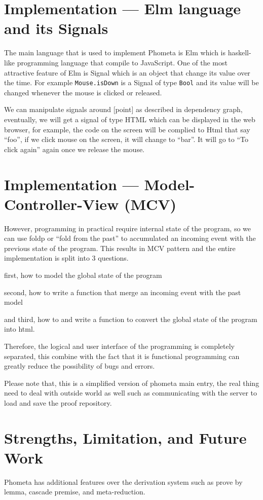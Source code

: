 \documentclass[11pt, a4paper]{article}
\begin{document}
\section{Implementation --- Elm language and its Signals}

The main language that is used to implement Phometa is Elm which is haskell-like
programming language that compile to JavaScript. One of the most attractive
feature of Elm is Signal which is an object that change its value over the time.
For example \texttt{Mouse.isDown} is a Signal of type \texttt{Bool} and its
value will be changed whenever the mouse is clicked or released.

We can manipulate signals around [point] as described in dependency graph,
eventually, we will get a signal of type HTML which can be displayed in the web
browser, for example, the code on the screen will be complied to Html that say
``foo'', if we click mouse on the screen, it will change to ``bar''. It
will go to ``To click again'' again once we release the mouse.

\section{Implementation --- Model-Controller-View (MCV)}

However, programming in practical require internal state of the program, so we
can use foldp or ``fold from the past'' to accumulated an incoming event
with the previous state of the program. This results in MCV pattern
and the entire implementation is split into 3 questions.

first, how to model the global state of the program

second, how to write a function that merge an incoming event with the past model

and third, how to and write a function to convert the global state of the
program into html.

Therefore, the logical and user interface of the programming is completely
separated, this combine with the fact that it is functional programming can
greatly reduce the possibility of bugs and errors.

Please note that, this is a simplified version of phometa main entry, the
real thing need to deal with outside world as well such as communicating with
the server to load and save the proof repository.

\section{Strengths, Limitation, and Future Work}
Phometa has additional features over the derivation system such as prove by
lemma, cascade premise, and meta-reduction.
\end{document}

